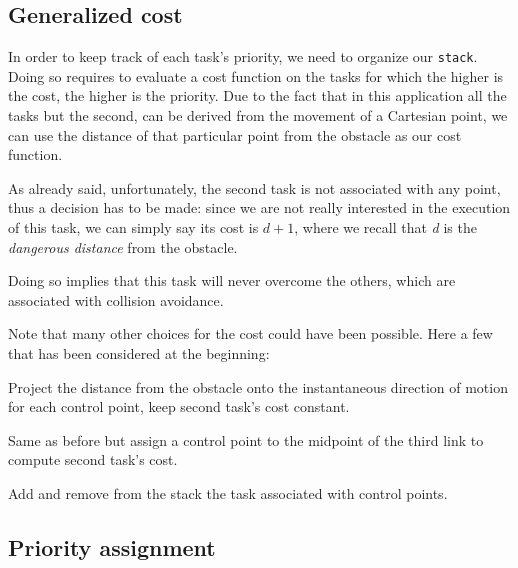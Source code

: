 \documentclass[12pt, a4paper]{article}
\begin{document}
\subsection{Generalized cost}
In order to keep track of each task's priority, we need to organize our \texttt{stack}. Doing so requires to evaluate a cost function on the tasks for which the higher is the cost, the higher is the priority. Due to the fact that in this application all the tasks but the second, can be derived from the movement of a Cartesian point, we can use the distance of that particular point from the obstacle as our cost function.

As already said, unfortunately, the second task is not associated with any point, thus a decision has to be made: since we are not really interested in the execution of this task, we can simply say its cost is $d+1$, where we recall that \textit{d} is the \emph{dangerous distance} from the obstacle.

Doing so implies that this task will never overcome the others, which are associated with collision avoidance.



Note that many other choices for the cost could have been possible. Here a few that has been considered at the beginning:
\begin{list}{\textbf{Case:}}{}
\item Project the distance from the obstacle onto the instantaneous direction of motion for each control point, keep second task's cost constant.
\item Same as before but assign a control point to the midpoint of the third link to compute second task's cost.
\item Add and remove from the stack the task associated with control points.
\end{list}
\subsection{Priority assignment}
\end{document}
